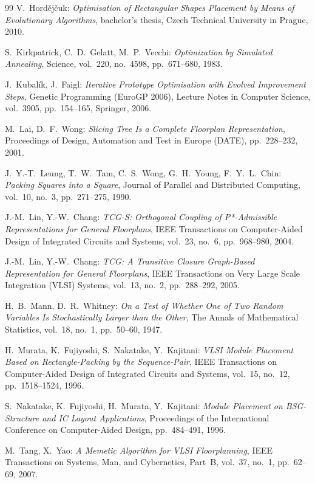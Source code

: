 \begin{thebibliography}{99}
V.~Hordějčuk:
{\em Optimisation of Rectangular Shapes Placement by Means of Evolutionary Algorithms},
bachelor's thesis, Czech Technical University in Prague,
2010.

S.~Kirkpatrick, C.~D.~Gelatt, M.~P.~Vecchi:
{\em Optimization by Simulated Annealing},
Science, vol.~220, no.~4598, pp.~671--680,
1983.

J.~Kubalík, J.~Faigl:
{\em Iterative Prototype Optimisation with Evolved Improvement Steps},
Genetic Programming (EuroGP 2006), Lecture Notes in Computer Science, vol.~3905, pp.~154--165, Springer,
2006.

M.~Lai, D.~F.~Wong:
{\em Slicing Tree Is a Complete Floorplan Representation},
Proceedings of Design, Automation and Test in Europe (DATE), pp.~228--232,
2001.

J.~Y.-T.~Leung, T.~W.~Tam, C.~S.~Wong, G.~H.~Young, F.~Y.~L.~Chin:
{\em Packing Squares into a Square},
Journal of Parallel and Distributed Computing, vol.~10, no.~3, pp.~271--275,
1990.

J.-M.~Lin, Y.-W.~Chang:
{\em TCG-S: Orthogonal Coupling of P*-Admissible Representations for General Floorplans},
IEEE Transactions on Computer-Aided Design of Integrated Circuits and Systems, vol.~23, no.~6, pp.~968--980,
2004.

J.-M.~Lin, Y.-W.~Chang:
{\em TCG: A Transitive Closure Graph-Based Representation for General Floorplans},
IEEE Transactions on Very Large Scale Integration (VLSI) Systems, vol.~13, no.~2, pp.~288--292,
2005.

H.~B.~Mann, D.~R.~Whitney:
{\em On a Test of Whether One of Two Random Variables Is Stochastically Larger than the Other},
The Annals of Mathematical Statistics, vol.~18, no.~1, pp.~50--60,
1947.

H.~Murata, K.~Fujiyoshi, S.~Nakatake, Y.~Kajitani:
{\em VLSI Module Placement Based on Rectangle-Packing by the Sequence-Pair},
IEEE Transactions on Computer-Aided Design of Integrated Circuits and Systems, vol.~15, no.~12, pp.~1518--1524,
1996.

S.~Nakatake, K.~Fujiyoshi, H.~Murata, Y.~Kajitani:
{\em Module Placement on BSG-Structure and IC Layout Applications},
Proceedings of the International Conference on Computer-Aided Design, pp.~484--491,
1996.

M.~Tang, X.~Yao:
{\em A Memetic Algorithm for VLSI Floorplanning},
IEEE Transactions on Systems, Man, and Cybernetics, Part~B, vol.~37, no.~1, pp.~62--69,
2007.


\end{thebibliography}
